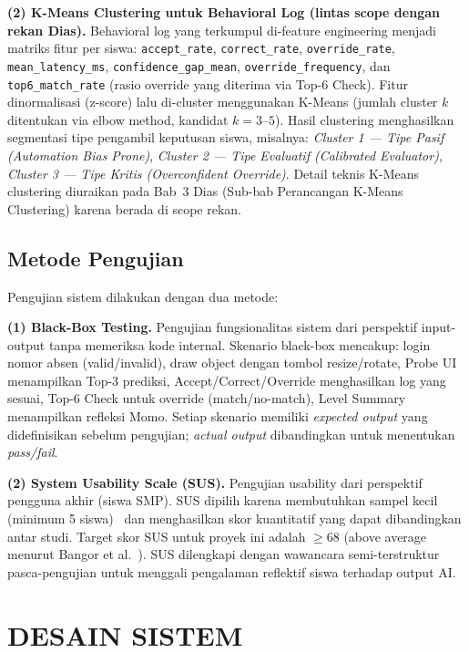\documentclass[12pt,a4paper,oneside,openany]{report}
\begin{document}
\textbf{(2) K-Means Clustering untuk Behavioral Log (lintas scope dengan rekan Dias).} Behavioral log yang terkumpul di-feature engineering menjadi matriks fitur per siswa: \texttt{accept\_rate}, \texttt{correct\_rate}, \texttt{override\_rate}, \texttt{mean\_latency\_ms}, \texttt{confidence\_gap\_mean}, \texttt{override\_frequency}, dan \texttt{top6\_match\_rate} (rasio override yang diterima via Top-6 Check). Fitur dinormalisasi (z-score) lalu di-cluster menggunakan K-Means (jumlah cluster $k$ ditentukan via elbow method, kandidat $k = 3$--$5$). Hasil clustering menghasilkan segmentasi tipe pengambil keputusan siswa, misalnya: \textit{Cluster 1 --- Tipe Pasif (Automation Bias Prone)}, \textit{Cluster 2 --- Tipe Evaluatif (Calibrated Evaluator)}, \textit{Cluster 3 --- Tipe Kritis (Overconfident Override)}. Detail teknis K-Means clustering diuraikan pada Bab~3 Dias (Sub-bab Perancangan K-Means Clustering) karena berada di scope rekan.

\subsection{Metode Pengujian}
\label{subsec:metode-pengujian}

Pengujian sistem dilakukan dengan dua metode:

\textbf{(1) Black-Box Testing.} Pengujian fungsionalitas sistem dari perspektif input-output tanpa memeriksa kode internal. Skenario black-box mencakup: login nomor absen (valid/invalid), draw object dengan tombol resize/rotate, Probe UI menampilkan Top-3 prediksi, Accept/Correct/Override menghasilkan log yang sesuai, Top-6 Check untuk override (match/no-match), Level Summary menampilkan refleksi Momo. Setiap skenario memiliki \textit{expected output} yang didefinisikan sebelum pengujian; \textit{actual output} dibandingkan untuk menentukan \textit{pass/fail}.

\textbf{(2) System Usability Scale (SUS).} Pengujian usability dari perspektif pengguna akhir (siswa SMP). SUS dipilih karena membutuhkan sampel kecil (minimum 5 siswa)~\cite{ref15}\cite{ref16} dan menghasilkan skor kuantitatif yang dapat dibandingkan antar studi. Target skor SUS untuk proyek ini adalah $\geq 68$ (above average menurut Bangor et al.~\cite{ref16}). SUS dilengkapi dengan wawancara semi-terstruktur pasca-pengujian untuk menggali pengalaman reflektif siswa terhadap output AI.

\section{DESAIN SISTEM}
\label{sec:desain-sistem}
\end{document}
